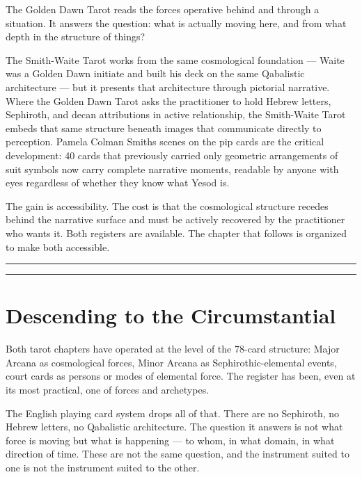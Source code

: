 The Golden Dawn Tarot reads the forces operative behind and through a situation. It answers the question: what is actually moving here, and from what depth in the structure of things?

The Smith-Waite Tarot works from the same cosmological foundation --- Waite was a Golden Dawn initiate and built his deck on the same Qabalistic architecture --- but it presents that architecture through pictorial narrative. Where the Golden Dawn Tarot asks the practitioner to hold Hebrew letters, Sephiroth, and decan attributions in active relationship, the Smith-Waite Tarot embeds that same structure beneath images that communicate directly to perception. Pamela Colman Smith\textquotesingle s scenes on the pip cards are the critical development: 40 cards that previously carried only geometric arrangements of suit symbols now carry complete narrative moments, readable by anyone with eyes regardless of whether they know what Yesod is.

The gain is accessibility. The cost is that the cosmological structure recedes behind the narrative surface and must be actively recovered by the practitioner who wants it. Both registers are available. The chapter that follows is organized to make both accessible.

\begin{center}\rule{0.5\linewidth}{0.5pt}\end{center}

\begin{center}\rule{0.5\linewidth}{0.5pt}\end{center}

\section{Descending to the Circumstantial}\label{between-chapters-two-and-three}

Both tarot chapters have operated at the level of the 78-card structure: Major Arcana as cosmological forces, Minor Arcana as Sephirothic-elemental events, court cards as persons or modes of elemental force. The register has been, even at its most practical, one of forces and archetypes.

The English playing card system drops all of that. There are no Sephiroth, no Hebrew letters, no Qabalistic architecture. The question it answers is not what force is moving but what is happening --- to whom, in what domain, in what direction of time. These are not the same question, and the instrument suited to one is not the instrument suited to the other.

